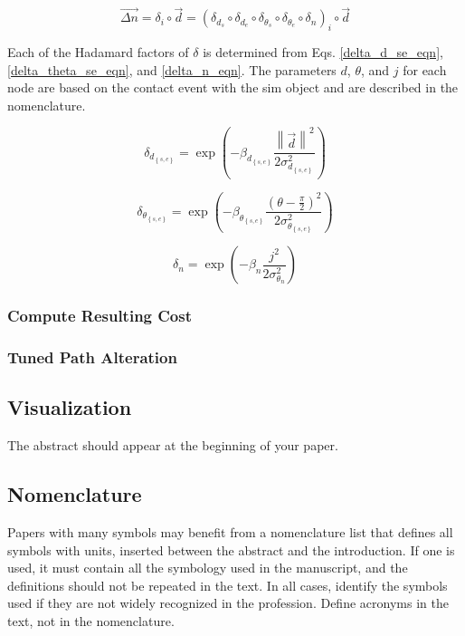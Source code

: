 \documentclass[conf]{new-aiaa}
\begin{document}
\begin{equation}
\label{change_vector_eqn}
\vec{{\Delta}{n}} = {{\delta}}_i\circ{\vec{d}} = \left({{\delta}_{d_s}}\circ{{\delta}_{d_e}}\circ{{\delta}_{\theta_s}}\circ{{\delta}_{\theta_e}}\circ{{\delta}_n}\right)_i\circ{\vec{d}}
\end{equation}

Each of the Hadamard factors of $\delta$ is determined from Eqs. \ref{delta_d_se_eqn}, \ref{delta_theta_se_eqn}, and \ref{delta_n_eqn}. The parameters $d$, $\theta$, and $j$ for each node are based on the contact event with the sim object and are described in the nomenclature.

\begin{equation}
\label{delta_d_se_eqn}
\delta_{d_{\left\{s,e\right\}}} = \exp\left({-\beta_{d_{\left\{s,e\right\}}}\frac{\left\|\vec{d}\right\|^2}{2\sigma_{d_{\left\{s,e\right\}}}^2}}\right)
\end{equation}

\begin{equation}
\label{delta_theta_se_eqn}
\delta_{\theta_{\left\{s,e\right\}}} = \exp\left({-\beta_{\theta_{\left\{s,e\right\}}}\frac{{\left(\theta - \frac{\pi}{2}\right)}^2}{2\sigma_{\theta_{\left\{s,e\right\}}}^2}}\right)
\end{equation}

\begin{equation}
\label{delta_n_eqn}
\delta_n = \exp\left({-\beta_n\frac{j^2}{2\sigma_{\theta_n}^2}}\right)
\end{equation}

\subsubsection{Compute Resulting Cost}

\subsubsection{Tuned Path Alteration}


\subsection{Visualization}
The abstract should appear at the beginning of your paper. 

\subsection{Nomenclature}
Papers with many symbols may benefit from a nomenclature list that defines all symbols with units, inserted between the abstract and the introduction. If one is used, it must contain all the symbology used in the manuscript, and the definitions should not be repeated in the text. In all cases, identify the symbols used if they are not widely recognized in the profession. Define acronyms in the text, not in the nomenclature.
\end{document}
